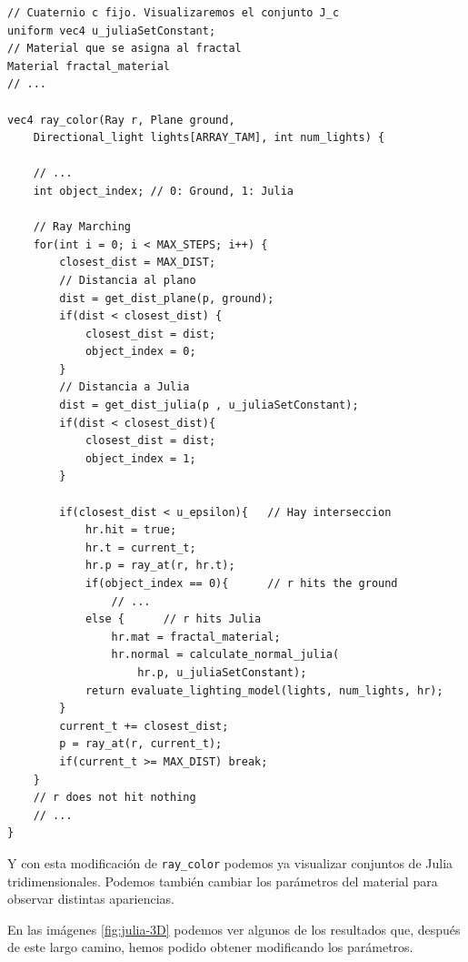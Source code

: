 \begin{lstlisting}
// Cuaternio c fijo. Visualizaremos el conjunto J_c
uniform vec4 u_juliaSetConstant;
// Material que se asigna al fractal
Material fractal_material
// ...

vec4 ray_color(Ray r, Plane ground, 
    Directional_light lights[ARRAY_TAM], int num_lights) {

    // ... 
    int object_index; // 0: Ground, 1: Julia

    // Ray Marching
    for(int i = 0; i < MAX_STEPS; i++) {
        closest_dist = MAX_DIST;
        // Distancia al plano
        dist = get_dist_plane(p, ground);
        if(dist < closest_dist) {
            closest_dist = dist;
            object_index = 0;
        }
        // Distancia a Julia
        dist = get_dist_julia(p , u_juliaSetConstant);
        if(dist < closest_dist){
            closest_dist = dist;
            object_index = 1;
        }

        if(closest_dist < u_epsilon){   // Hay interseccion
            hr.hit = true;
            hr.t = current_t;
            hr.p = ray_at(r, hr.t);
            if(object_index == 0){      // r hits the ground
                // ... 
            else {      // r hits Julia
                hr.mat = fractal_material;
                hr.normal = calculate_normal_julia(
                    hr.p, u_juliaSetConstant);
            return evaluate_lighting_model(lights, num_lights, hr);
        }
        current_t += closest_dist;
        p = ray_at(r, current_t);
        if(current_t >= MAX_DIST) break;
    }
    // r does not hit nothing
    // ... 
}
\end{lstlisting}

Y con esta modificación de \verb|ray_color| podemos ya visualizar conjuntos de Julia tridimensionales. Podemos también cambiar los parámetros del material para observar distintas apariencias. 

En las imágenes \ref{fig:julia-3D} podemos ver algunos de los resultados que, después de este largo camino, hemos podido obtener modificando los parámetros.

